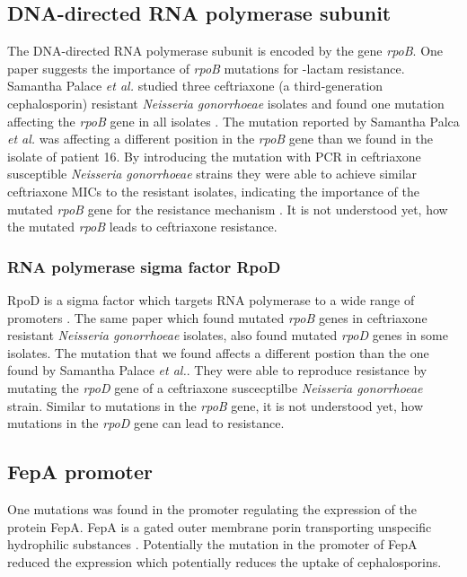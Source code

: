 \subsection{DNA-directed RNA polymerase subunit \textbeta}
The DNA-directed RNA polymerase subunit \textbeta \space is encoded by the gene \textit{rpoB}. One paper suggests the importance  of \textit{rpoB} mutations for \textbeta-lactam resistance. Samantha Palace \textit{et al.} studied three ceftriaxone (a third-generation cephalosporin) resistant \textit{Neisseria gonorrhoeae} isolates and found one mutation affecting the \textit{rpoB} gene in all isolates \cite{palace_rna_2019}. The mutation reported by Samantha Palca \textit{et al.} was affecting a different position in the \textit{rpoB} gene than we found in the isolate of patient 16. By introducing the mutation with PCR in ceftriaxone susceptible \textit{Neisseria gonorrhoeae} strains they were able to achieve similar ceftriaxone MICs to the resistant isolates, indicating the importance of the mutated \textit{rpoB} gene for the resistance mechanism \cite{palace_rna_2019}. It is not understood yet, how the mutated \textit{rpoB} leads to ceftriaxone resistance. \\


\subsubsection{RNA polymerase sigma factor RpoD}
RpoD is a sigma factor which targets RNA polymerase to a wide range of promoters \cite{maciag_vitro_2011}. The same paper which found mutated \textit{rpoB} genes in ceftriaxone resistant \textit{Neisseria gonorrhoeae} isolates, also found mutated \textit{rpoD} genes in some isolates. The mutation that we found affects a different postion than the one found by Samantha Palace \textit{et al.}. They were able to reproduce resistance by mutating the \textit{rpoD} gene of a ceftriaxone suscecptilbe \textit{Neisseria gonorrhoeae} strain. Similar to mutations in the \textit{rpoB} gene, it is not understood yet, how mutations in the \textit{rpoD} gene can lead to resistance.  

\subsection{FepA promoter}
One mutations was found in the promoter regulating the expression of the protein FepA. FepA is a gated outer membrane porin transporting unspecific hydrophilic substances \cite{liu_permeability_1993}. Potentially the mutation in the promoter of FepA reduced the expression which potentially reduces the uptake of cephalosporins.  

